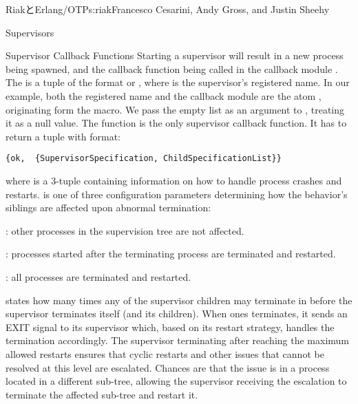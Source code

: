 \begin{aosachapter}{RiakとErlang/OTP}{s:riak}{Francesco Cesarini, Andy Gross, and Justin Sheehy}
\begin{aosasect1}{Supervisors}
\begin{aosasect2}{Supervisor Callback Functions}
\noindent Starting a supervisor will result in a new process being spawned, and
the  callback function being called in the callback
module . The  is a tuple of
the format  or , where
 is the supervisor's registered name. In our example, both
the registered name and the callback module are the atom
, originating form the  macro. We
pass the empty list as an argument to , treating it as a
null value. The  function is the only supervisor callback
function. It has to return a tuple with format:

\begin{verbatim}
{ok,  {SupervisorSpecification, ChildSpecificationList}}
\end{verbatim}

\noindent where  is a 3-tuple 
 containing
information on how to handle process crashes and
restarts.  is one of three configuration
parameters determining how the behavior's siblings are affected upon
abnormal termination:

\begin{aosaitemize}

  \item {}: other processes in the supervision tree
  are not affected.

  \item {}: processes started after the terminating
  process are terminated and restarted.

  \item {}: all processes are terminated and restarted.

\end{aosaitemize}

 states how many times any of the supervisor
children may terminate in  before the supervisor
terminates itself (and its children).  When ones terminates,
it sends an EXIT signal to its
supervisor which, based on its restart strategy, handles the termination
accordingly. The supervisor terminating after reaching the maximum
allowed restarts ensures that cyclic restarts and other issues that
cannot be resolved at this level are escalated. Chances are that the
issue is in a process located in a different sub-tree, allowing the
supervisor receiving the escalation to terminate the affected sub-tree
and restart it.


\end{aosasect2}
\end{aosasect1}
\end{aosachapter}
